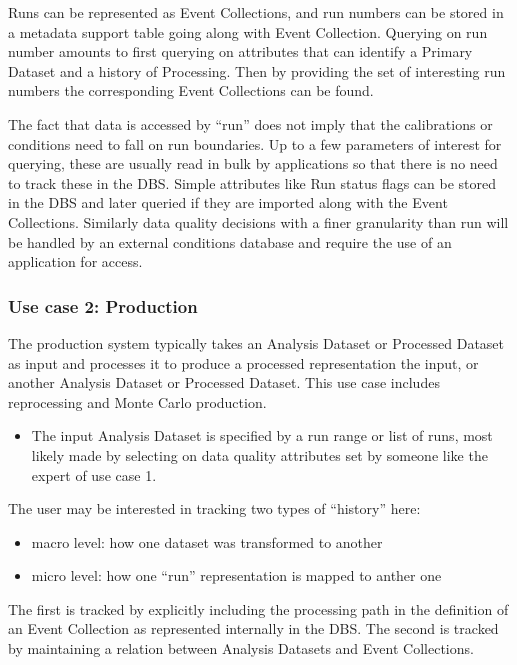 \documentclass{cmspaper}
\begin{document}
Runs can be represented as Event Collections, and run numbers can be stored 
in a metadata support table going along with Event Collection.  Querying on 
run number amounts to first querying on attributes that can identify a 
Primary Dataset and a history of Processing.  Then by providing the set of 
interesting run numbers the corresponding Event Collections can be found.

The fact that data is accessed by ``run'' does not imply that the 
calibrations or conditions need to fall on run boundaries.  Up to a few 
parameters of interest for querying, these are usually 
read in bulk by applications so that there is no need to track these in the 
DBS.    Simple attributes like Run status flags 
can be stored in the DBS and later queried 
if they are imported along with the Event Collections.
Similarly data quality decisions with a finer granularity than 
run will be handled by an external conditions database and require 
the use of an application for access. 

\subsubsection{Use case 2: Production}
\label{sec:UCprod}

  The production system typically takes an Analysis Dataset or Processed Dataset
as input and processes it to produce a processed representation the input, or 
another Analysis Dataset or Processed Dataset. This use case includes reprocessing
and Monte Carlo production.


\begin{itemize}
\item The input Analysis Dataset is specified by a run range or list
     of runs, most likely made by selecting on data quality attributes set by
     someone like the expert of use case 1.  
\end{itemize}

The user may be interested in tracking two types of ``history'' here:
\begin{itemize}
      \item macro level: how one dataset was transformed to another
      \item micro level: how one ``run'' representation is mapped to anther one
\end{itemize}
The first is tracked by explicitly including the processing path in the
definition of an Event Collection as represented internally in the DBS.  
The second is tracked by maintaining a relation between Analysis Datasets
and Event Collections.
\end{document}
